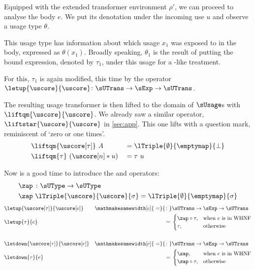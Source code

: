 Equipped with the extended transformer environment $\rho'$, we can proceed to analyse the body $e$. 
We put its denotation under the incoming use $u$ and observe a usage type $\theta$.

This usage type has information about which usage $x_1$ was exposed to in the body, expressed as $\theta(x_1)$. 
Broadly speaking, $\theta_1$ is the result of putting the bound expression, denoted by $\tau_1$, under this usage for a -like treatment.

For this, $\tau_1$ is again modified, this time by the  operator $\letup{\uscore}{\uscore} \colon \sUTrans \to \sExp \to \sUTrans$.

The resulting usage transformer is then lifted to the domain of $\sUsage$s with $\liftqm{\uscore}{\uscore}$. 
We already saw a similar operator, $\liftstar{\uscore}{\uscore}$ in \cref{sec:app}. 
This one lifts with a question mark, reminiscent of `zero or one times'.
\begin{alignat*}{2}
&\liftqm{\uscore[\tau]}~A     &{}={}& \lTriple{\emptyset}{\emptymap}{\bot} \\
&\liftqm{\tau}~(\uscore[n]*u) &{}={}& \tau~u
\end{alignat*}

Now is a good time to introduce the  and  operators:
\begin{alignat*}{1}
&\zap~{}\colon\sUType \to \sUType \\
&\zap~\lTriple{\uscore}{\uscore}{\sigma} = \lTriple{\emptyset}{\emptymap}{\sigma}
\end{alignat*}
\begin{alignat*}{2}
  &\letup{\uscore[\tau]}{\uscore[e]} &\mathmakesamewidth[c]{{}=}{\colon} &\sUTrans \to \sExp \to \sUTrans \\
  &\letup{\tau}{e} &{}={}&
  \begin{cases}
    \zap\circ\tau, & \text{when } e \text{ is in WHNF} \\
    \tau, & \text{otherwise}
  \end{cases} \\
\\
  &\letdown{\uscore[\tau]}{\uscore[e]} &\mathmakesamewidth[c]{{}=}{\colon} &\sUTrans \to \sExp \to \sUTrans \\
  &\letdown{\tau}{e} &{}={}&
  \begin{cases}
    \zap, & \text{when } e \text{ is in WHNF} \\
    \zap\circ\tau, & \text{otherwise}
  \end{cases}
\end{alignat*}


